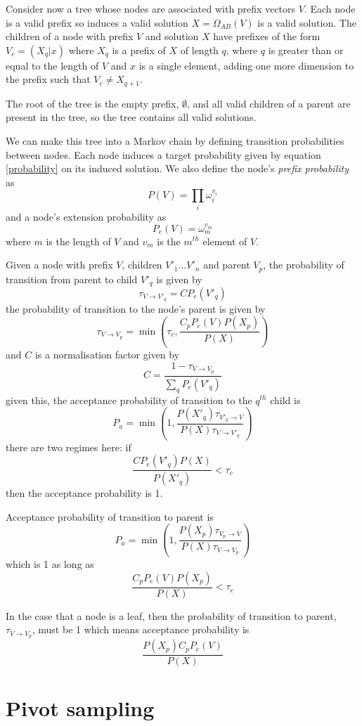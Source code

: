\documentclass{article}
\begin{document}
Consider now a tree whose nodes are associated with prefix vectors $V$. Each node is a valid prefix so induces a valid solution $X = \Omega_{AB}(V)$ is a valid solution. The children of a node with prefix $V$ and solution $X$ have prefixes of the form $V_c = (X_q|x)$ where $X_q$ is a prefix of $X$ of length $q$, where $q$ is greater than or equal to the length of $V$ and $x$ is a single element, adding one more dimension to the prefix such that $V_c \ne X_{q+1}$.

The root of the tree is the empty prefix, $\emptyset$, and all valid children of a parent are present in the tree, so the tree contains all valid solutions.

We can make this tree into a Markov chain by defining transition probabilities between nodes. Each node induces a target probability given by equation \ref{probability} on its induced solution. We also define the node's \textit{prefix probability} as 
\[
P(V) = \prod_i \omega_i^{v_i}
\]
and a node's extension probability as
\[
P_e(V) = \omega_m^{v_m}
\]
where $m$ is the length of $V$ and $v_m$ is the $m^{th}$ element of $V$.

Given a node with prefix $V$, children $V'_1...V'_n$ and parent $V_p$, the probability of transition from parent to child $V'_q$ is given by
\[
\tau_{V\rightarrow V'_q} = CP_e(V'_q)
\]
the probability of transition to the node's parent is given by
\[
\tau_{V\rightarrow V_p} = \min\left(\tau_c, \frac{C_pP_e(V)P(X_p)}{P(X)}\right)
\]
and $C$ is a normalisation factor given by
\[
C =  \frac{1 - \tau_{V\rightarrow V_p}}{\sum_q P_e(V'_q)}
\]
given this, the acceptance probability of transition to the $q^{th}$ child is
\[
P_a = \min\left(1, \frac{P(X'_q)\tau_{V'_q\rightarrow V}}{P(X)\tau_{V\rightarrow V'_q}}\right)
\]
there are two regimes here: if
\[
\frac{CP_e(V'_q)P(X)}{P(X'_q)} < \tau_c 
\]
then the acceptance probability is 1.

Acceptance probability of transition to parent is
\[
P_a = \min\left(1, \frac{P(X_p)\tau_{V_p\rightarrow V}}{P(X)\tau_{V\rightarrow V_p}}\right)
\]
which is 1 as long as
\[
\frac{C_pP_e(V)P(X_p)}{P(X)} < \tau_c
\]

In the case that a node is a leaf, then the probability of transition to parent, $\tau_{V\rightarrow V_p}$, must be 1 which means acceptance probability is
\[
\frac{P(X_p)C_pP_e(V)}{P(X)}
\]

\section{Pivot sampling}
\end{document}
